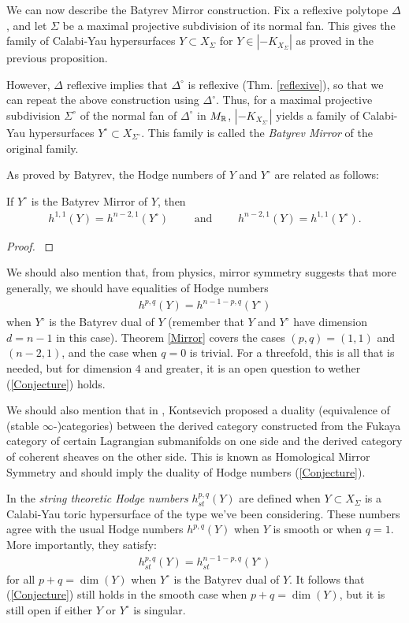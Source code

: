 \documentclass[../main.tex]{subfiles}
\begin{document}
We can now describe the Batyrev Mirror construction. Fix a reflexive polytope $\Delta$, and let $\Sigma$ be a maximal projective subdivision of its normal fan. This gives the family of Calabi-Yau hypersurfaces $Y \subset X_\Sigma$ for $Y \in |-K_{X_\Sigma}|$ as proved in the previous proposition.

However, $\Delta$ reflexive implies that $\Delta^\circ$ is reflexive (Thm. \ref{reflexive}), so that we can repeat the above construction using $\Delta^\circ$. Thus, for a maximal projective subdivision $\Sigma^\circ$ of the normal fan of $\Delta^\circ$ in $M_{\mathbb{R}}$, $|-K_{X_{\Sigma^\circ}}|$ yields a family of Calabi-Yau hypersurfaces $Y^\circ \subset X_{\Sigma^\circ}$. This family is called the \emph{Batyrev Mirror} of the original family.

As proved by Batyrev, the Hodge numbers of $Y$ and $Y^\circ$ are related as follows:
\begin{theorem} \label{Mirror}
    If $Y^\circ$ is the Batyrev Mirror of $Y$, then
    \begin{align*}
        h^{1,1}(Y) = h^{n-2,1}(Y^\circ) \qquad \text{ and } \qquad h^{n-2,1}(Y) = h^{1,1}(Y^\circ).
    \end{align*}
\end{theorem}
\begin{proof}
     \cite[Thm. 4.4.3]{Bat94}
\end{proof}

We should also mention that, from physics, mirror symmetry suggests that more generally, we should have equalities of Hodge numbers
\begin{align} \label{Conjecture}
    h^{p,q}(Y)=h^{n-1-p,q}(Y^\circ)
\end{align}
when $Y^\circ$ is the Batyrev dual of $Y$ (remember that $Y$ and $Y^\circ$ have dimension $d=n-1$ in this case). Theorem \ref{Mirror} covers the cases $(p,q)=(1,1)$ and $(n-2,1)$, and the case when $q=0$ is trivial. For a threefold, this is all that is needed, but for dimension $4$ and greater, it is an open question to wether (\ref{Conjecture}) holds.

We should also mention that in \cite{Kon95}, Kontsevich proposed a duality (equivalence of (stable $\infty$-)categories) between the derived category constructed from the Fukaya category of certain Lagrangian submanifolds on one side and the derived category of coherent sheaves on the other side. This is known as Homological Mirror Symmetry and should imply the duality of Hodge numbers (\ref{Conjecture}).

In \cite{BB96} the \emph{string theoretic Hodge numbers} $h^{p,q}_{st}(Y)$ are defined when $Y \subset X_\Sigma$ is a Calabi-Yau toric hypersurface of the type we've been considering. These numbers agree with the usual Hodge numbers $h^{p,q}(Y)$ when $Y$ is smooth or when $q=1$. More importantly, they satisfy:
\begin{align*}
    h^{p,q}_{st}(Y) = h^{n-1-p,q}_{st}(Y^\circ)
\end{align*}
for all $p+q=\dim (Y)$ when $Y^\circ$ is the Batyrev dual of $Y$. It follows that (\ref{Conjecture}) still holds in the smooth case when $p+q=\dim (Y)$, but it is still open if either $Y$ or $Y^\circ$ is singular.
\end{document}
